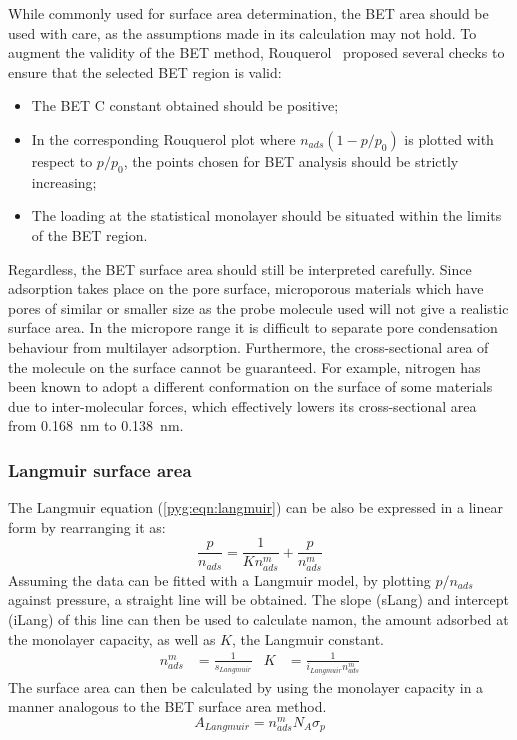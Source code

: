 While commonly used for surface area determination, the \gls{BET} area
should be used with care, as the assumptions made in
its calculation may not hold. To augment the validity of the \gls{BET}
method, Rouquerol~\cite{rouquerolAdsorptionPowdersPorous2013} proposed
several checks to ensure that the selected \gls{BET} region is valid:

\begin{itemize}

	\item The \gls{BET} \gls{C} constant obtained should be positive;
	\item In the corresponding Rouquerol plot where \(n_{ads}(1-p/p_0)\)
	      is plotted with respect to \(p/p_0\), the points chosen for \gls{BET}
	      analysis should be strictly increasing;
	\item The loading at the statistical monolayer should be
	      situated within the limits of the \gls{BET} region.

\end{itemize}

Regardless, the \gls{BET} surface area should still be interpreted carefully.
Since adsorption takes place on the pore surface, microporous materials
which have pores of similar or smaller size as the probe molecule used
will not give a realistic surface area. In the micropore range
it is difficult to separate pore condensation behaviour from
multilayer adsorption. Furthermore, the cross-sectional
area of the molecule on the surface cannot be guaranteed. For example,
nitrogen has been known to adopt a different conformation on the surface
of some materials due to inter-molecular forces, which effectively
lowers its cross-sectional area~\cite{rouquerolAdsorptionPowdersPorous2013}
from \SI{0.168}{\nano\metre} to \SI{0.138}{\nano\metre}.

\subsubsection{Langmuir surface area}\label{pyg:charac:langmuirarea}

The Langmuir equation (\autoref{pyg:eqn:langmuir}) can be also
be expressed in a linear form by rearranging it as:
%
\begin{equation}
	\frac{p}{n_{ads}} = \frac{1}{K n_{ads}^m} + \frac{p}{n_{ads}^m}
\end{equation}
%
Assuming the data can be fitted with a Langmuir model, by plotting
\({p}/{n_{ads}}\) against pressure, a straight line will be obtained.
The slope (\gls{sLang}) and intercept (\gls{iLang}) of this line can then be used 
to calculate \gls{namon}, the amount adsorbed at the monolayer capacity, 
as well as \(K\), the Langmuir constant.
%
\begin{align}
	n_{ads}^m & = \frac{1}{s_{Langmuir}} & K & = \frac{1}{i_{Langmuir} n_{ads}^m}
\end{align}
%
The surface area can then be calculated by using the monolayer
capacity in a manner analogous to the \gls{BET} surface area method.
%
\begin{equation}
	A_{Langmuir} = n_{ads}^m N_A \sigma_p
\end{equation}

